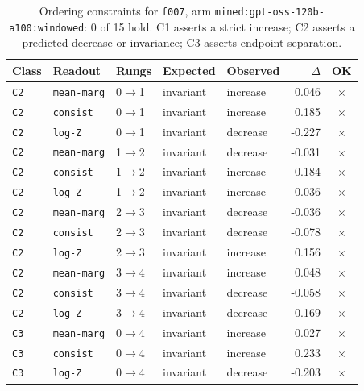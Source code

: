 \documentclass[11pt]{article}
\begin{document}
\begin{table}[htbp]
\centering
\small
\caption{Ordering constraints for \texttt{f007}, arm \texttt{mined:gpt-oss-120b-a100:windowed}: 0 of 15 hold. C1 asserts a strict increase; C2 asserts a predicted decrease or invariance; C3 asserts endpoint separation.}
\label{tab:ladder-f007-mined-gpt-oss-120b-a100-windowed}
\begin{tabular}{lllllrc}
\toprule
Class & Readout & Rungs & Expected & Observed & $\Delta$ & OK \\
\midrule
\texttt{C2} & \texttt{mean-marg} & 0$\to$1 & invariant & increase & 0.046 & $\times$ \\
\texttt{C2} & \texttt{consist} & 0$\to$1 & invariant & increase & 0.185 & $\times$ \\
\texttt{C2} & \texttt{log-Z} & 0$\to$1 & invariant & decrease & -0.227 & $\times$ \\
\texttt{C2} & \texttt{mean-marg} & 1$\to$2 & invariant & decrease & -0.031 & $\times$ \\
\texttt{C2} & \texttt{consist} & 1$\to$2 & invariant & increase & 0.184 & $\times$ \\
\texttt{C2} & \texttt{log-Z} & 1$\to$2 & invariant & increase & 0.036 & $\times$ \\
\texttt{C2} & \texttt{mean-marg} & 2$\to$3 & invariant & decrease & -0.036 & $\times$ \\
\texttt{C2} & \texttt{consist} & 2$\to$3 & invariant & decrease & -0.078 & $\times$ \\
\texttt{C2} & \texttt{log-Z} & 2$\to$3 & invariant & increase & 0.156 & $\times$ \\
\texttt{C2} & \texttt{mean-marg} & 3$\to$4 & invariant & increase & 0.048 & $\times$ \\
\texttt{C2} & \texttt{consist} & 3$\to$4 & invariant & decrease & -0.058 & $\times$ \\
\texttt{C2} & \texttt{log-Z} & 3$\to$4 & invariant & decrease & -0.169 & $\times$ \\
\texttt{C3} & \texttt{mean-marg} & 0$\to$4 & invariant & increase & 0.027 & $\times$ \\
\texttt{C3} & \texttt{consist} & 0$\to$4 & invariant & increase & 0.233 & $\times$ \\
\texttt{C3} & \texttt{log-Z} & 0$\to$4 & invariant & decrease & -0.203 & $\times$ \\
\bottomrule
\end{tabular}
\end{table}
\end{document}
